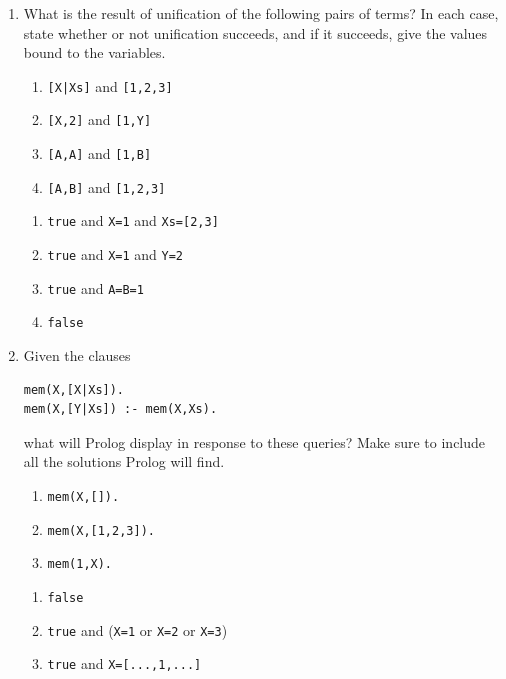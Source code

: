 \documentclass{article}
\begin{document}
\begin{enumerate}
\item
What is the result of unification of the following pairs of terms? In
each case, state whether or not unification succeeds, and if it
succeeds, give the values bound to the variables.  

\noindent
\begin{minipage}{0.5\textwidth}
  \begin{enumerate}
  \item
  \verb![X|Xs]! and \verb![1,2,3]!
  \item
  \verb![X,2]! and \verb![1,Y]!
  \item
  \verb![A,A]! and \verb![1,B]!
  \item
  \verb![A,B]! and \verb![1,2,3]!
  \end{enumerate}
\end{minipage}
\begin{minipage}{0.5\textwidth}
  \begin{enumerate}
  \item
  \verb|true| and \verb!X=1! and \verb!Xs=[2,3]!
  \item
  \verb|true| and \verb!X=1! and \verb!Y=2!
  \item
  \verb|true| and \verb!A=B=1!
  \item
  \verb|false|
  \end{enumerate}  
\end{minipage}

\item
Given the clauses
\begin{verbatim}
mem(X,[X|Xs]).
mem(X,[Y|Xs]) :- mem(X,Xs).
\end{verbatim}
what will Prolog display in response to these queries? Make sure to
include all the solutions Prolog will find.

\noindent
\begin{minipage}{0.5\textwidth}
  \begin{enumerate}
  \item \verb!mem(X,[]).!
  \item \verb!mem(X,[1,2,3]).!
  \item \verb!mem(1,X).!
  \end{enumerate}
\end{minipage}
\begin{minipage}{0.5\textwidth}
  \begin{enumerate}
  \item \verb!false!
  \item \verb!true! and (\verb!X=1! or \verb!X=2! or \verb!X=3!)
  \item \verb!true! and \verb!X=[...,1,...]!
  \end{enumerate}
\end{minipage}


\end{enumerate}
\end{document}
